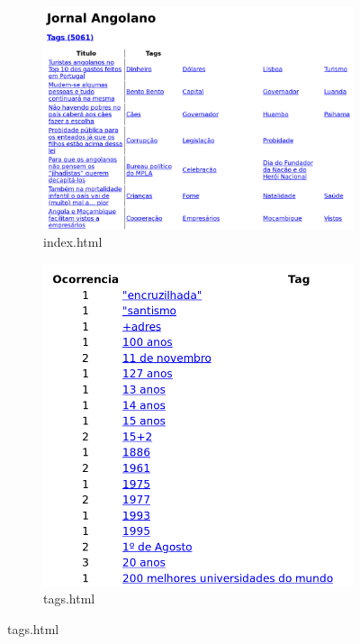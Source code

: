 \documentclass[a4paper]{report}
\begin{document}
\begin{figure}[H]
    \centering
    \begin{subfigure}{0.54\textwidth}
        \includegraphics[width=\textwidth]{./index_print.png}
        \caption{index.html}
    \end{subfigure}
    \begin{subfigure}{0.45\textwidth}
        \includegraphics[width=\textwidth]{./tags_print.png}
        \caption{tags.html}

\end{subfigure}
\end{figure}
\end{document}
